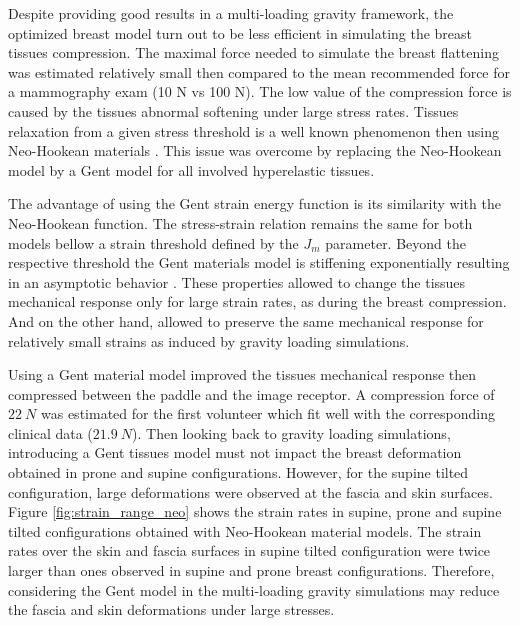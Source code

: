 Despite providing good results in a multi-loading gravity framework, the optimized breast model turn out to be less efficient in simulating the breast tissues compression. The maximal force needed to simulate the breast flattening was estimated relatively small then compared to the mean recommended force for a mammography exam (10 N vs 100 N). The low value of the compression force is caused by the tissues abnormal softening under large stress rates. Tissues relaxation from a given stress threshold is a well known phenomenon then using Neo-Hookean materials . This issue was overcome by replacing the Neo-Hookean model by a Gent model for all involved hyperelastic tissues.

 The advantage of using the Gent strain energy function is its similarity with the Neo-Hookean function. The stress-strain relation remains the same for both models bellow a strain threshold defined by the $J_m$ parameter. Beyond the respective threshold the Gent materials model is stiffening exponentially resulting in an asymptotic behavior . These properties allowed to change the tissues mechanical response only for large strain rates, as during the breast compression. And on the other hand, allowed to preserve the same mechanical response for relatively small strains as induced by gravity loading simulations.

Using a Gent material model improved the tissues mechanical response then compressed between the paddle and the image receptor. A compression force of $22 \ N$ was estimated for the first volunteer which fit well with the corresponding clinical data ($21.9 \ N$). Then looking back to gravity loading simulations, introducing a Gent tissues model must not impact the breast deformation obtained in prone and supine configurations. However, for the supine tilted configuration, large deformations were observed at the fascia and skin surfaces. Figure \ref{fig:strain_range_neo} shows the strain rates in supine, prone and supine tilted configurations obtained with Neo-Hookean material models. The strain rates over the skin and fascia surfaces in supine tilted configuration were twice larger than ones observed in supine and prone breast configurations. Therefore, considering the Gent model in the multi-loading gravity simulations may reduce the fascia and skin deformations under large stresses. 


